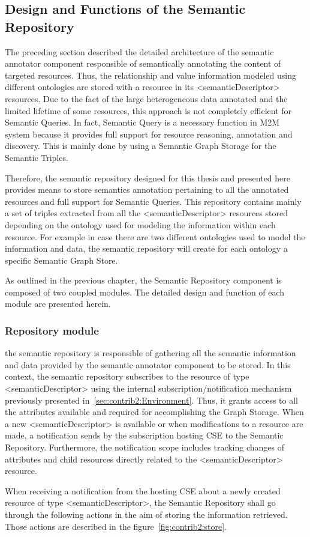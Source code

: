 \subsection{Design and Functions of the Semantic Repository }

The preceding section described the detailed architecture of the semantic annotator component responsible of semantically annotating the content of targeted resources. Thus, the relationship and value information modeled using different ontologies are stored with a resource in its <semanticDescriptor> resources. Due to the fact of the large heterogeneous data annotated and the limited lifetime of some resources, this approach is not completely efficient for Semantic Queries. In fact, Semantic Query is a necessary function in M2M system because it provides full support for resource reasoning, annotation and discovery. This is mainly done by using a Semantic Graph Storage for the Semantic Triples. \par 
Therefore, the semantic repository designed for this thesis and presented here provides means to store semantics annotation pertaining to all the annotated resources and full support for Semantic Queries. This repository contains mainly a set of triples extracted from all the <semanticDescriptor> resources stored depending on the ontology used for modeling the information within each resource. For example in case there are two different ontologies used to model the information and data, the semantic repository will create for each ontology a specific Semantic Graph Store. \par 
As outlined in the previous chapter, the Semantic Repository component is composed of two coupled modules. The detailed design and function of each module are presented herein.

\subsubsection{Repository module }
the semantic repository is responsible of gathering all the semantic information and data provided by the semantic annotator component to be stored.
In this context, the semantic repository subscribes to the resource of type <semanticDescriptor> using the internal subscription/notification mechanism previously presented in~\ref{sec:contrib2:Environment}. Thus, it grants access to all the attributes available and required for accomplishing the Graph Storage. When a new <semanticDescriptor> is available or when modifications to a resource are made, a notification sends by the subscription hosting CSE to the Semantic Repository. Furthermore, the notification scope includes tracking changes of attributes and child resources directly related to the <semanticDescriptor> resource. \par 
When receiving a notification from the hosting CSE about a newly created resource of type <semanticDescriptor>, the Semantic Repository shall go through the following actions in the aim of storing the information retrieved. Those actions are described in the figure~\ref{fig:contrib2:store}.


